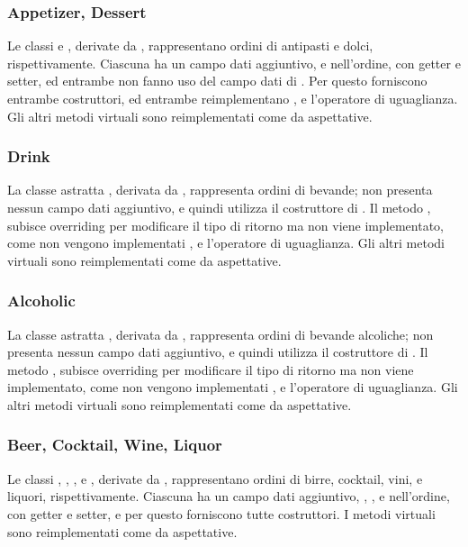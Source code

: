 \subsubsection{Appetizer, Dessert} %
\label{ssub:appetizer_e_dessert}
Le classi  e , derivate da , rappresentano ordini di antipasti e dolci, rispettivamente. Ciascuna ha un campo dati aggiuntivo,  e  nell'ordine, con getter e setter, ed entrambe non fanno uso del campo dati  di . Per questo forniscono entrambe costruttori, ed entrambe reimplementano ,  e l'operatore di uguaglianza. Gli altri metodi virtuali sono reimplementati come da aspettative.
\subsubsection{Drink} %
\label{ssub:drink}
La classe astratta , derivata da , rappresenta ordini di bevande; non presenta nessun campo dati aggiuntivo, e quindi utilizza il costruttore di . Il metodo , subisce overriding per modificare il tipo di ritorno ma non viene implementato, come non vengono implementati ,  e l'operatore di uguaglianza. Gli altri metodi virtuali sono reimplementati come da aspettative.
\subsubsection{Alcoholic} %
\label{ssub:alcoholic}
La classe astratta , derivata da , rappresenta ordini di bevande alcoliche; non presenta nessun campo dati aggiuntivo, e quindi utilizza il costruttore di . Il metodo , subisce overriding per modificare il tipo di ritorno ma non viene implementato, come non vengono implementati ,  e l'operatore di uguaglianza. Gli altri metodi virtuali sono reimplementati come da aspettative.
\subsubsection{Beer, Cocktail, Wine, Liquor} %
\label{ssub:beer_cocktail_wine_liquor}
Le classi , , , e , derivate da , rappresentano ordini di birre, cocktail, vini, e liquori, rispettivamente. Ciascuna ha un campo dati aggiuntivo, , ,  e  nell'ordine, con getter e setter, e per questo forniscono tutte costruttori. I metodi virtuali sono reimplementati come da aspettative.
